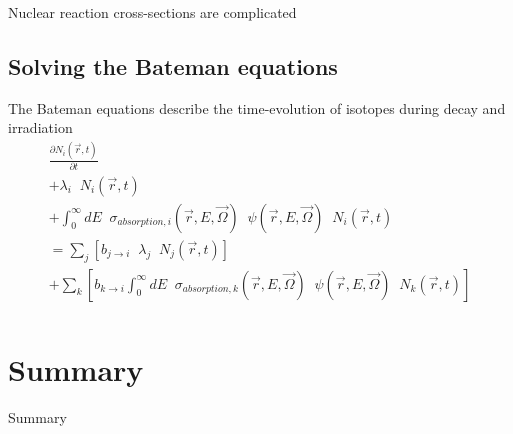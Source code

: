 \documentclass{beamer}
\begin{document}
    \begin{frame}{Nuclear reaction cross-sections are complicated}
    \end{frame}

\subsection{Solving the Bateman equations}

    \begin{frame}{The Bateman equations describe the time-evolution of isotopes during decay and irradiation}
        \begin{equation*}
            \begin{split}
                \frac{\partial N_i(\vec r, t)}{\partial t} \\
                + \lambda_i \; \; N_i(\vec r, t) \\
                + \int_0^\infty \! \! \! \! dE \; \; \sigma_{absorption,i} ( \vec r, E, \vec\Omega) \; \; \psi(\vec r, E, \vec \Omega) \; \; N_i(\vec r, t) \\
                = \sum_j \left[ b_{j \rightarrow i} \; \; \lambda_j \; \; N_j(\vec r, t) \right] \\
                + \sum_k \left[ b_{k \rightarrow i} \int_0^\infty \! \! \! \! dE \; \; \sigma_{absorption,k} ( \vec r, E, \vec\Omega) \; \; \psi(\vec r, E, \vec \Omega) \; \; N_k(\vec r, t) \right] \\
            \end{split}
        \end{equation*}
    \end{frame}

\section*{Summary}

    \begin{frame}{Summary}
    \end{frame}
\end{document}
